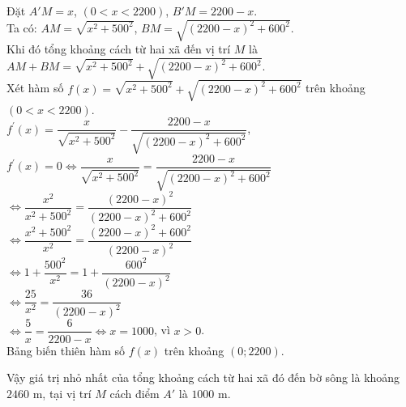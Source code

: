 \begin{vd}
{\begin{center}
		\end{center}
		Đặt $A'M=x$, $(0<x<2200)$,  $B'M=2200-x$.\\
		Ta có: $AM=\sqrt{x^2+500^2}$, $BM=\sqrt{(2200-x)^2+600^2}$.\\
		Khi đó tổng khoảng cách từ hai xã đến vị trí $M$ là $AM+BM= \sqrt{x^2+500^2}+\sqrt{(2200-x)^2+600^2} $.\\
		Xét hàm số $f(x)= \sqrt{x^2+500^2}+\sqrt{(2200-x)^2+600^2}$ trên khoảng $(0<x<2200)$.\\
		$f^\prime (x)=\dfrac{x}{\sqrt{x^2+500^2}}-\dfrac{2200-x}{\sqrt{(2200-x)^2+600^2}}$, $f^\prime (x)=0\Leftrightarrow \dfrac{x}{\sqrt{x^2+500^2}}=\dfrac{2200-x}{\sqrt{(2200-x)^2+600^2}}$\\
		$\Leftrightarrow \dfrac{x^2}{x^2+500^2}=\dfrac{(2200-x)^2}{(2200-x)^2+600^2}$\\
		$\Leftrightarrow \dfrac{x^2+500^2}{x^2}=\dfrac{(2200-x)^2+600^2}{(2200-x)^2}$\\
		$\Leftrightarrow 1+\dfrac{500^2}{x^2}=1+\dfrac{600^2}{(2200-x)^2}$\\
		$\Leftrightarrow \dfrac{25}{x^2}=\dfrac{36}{(2200-x)^2}$\\
		$\Leftrightarrow \dfrac{5}{x}=\dfrac{6}{2200-x}\Leftrightarrow x=1000$, vì $ x>0$.\\ 
		Bảng biến thiên hàm số $f(x)$ trên khoảng $\left( 0;2200\right)$.
		\begin{center}
		\end{center}
		Vậy giá trị nhỏ nhất của tổng khoảng cách từ hai xã đó đến bờ sông  là khoảng $2460 \text{ m}$, tại vị trí $M$ cách điểm $A'$  là $1000 \text{ m}$.
	}
\end{vd}

